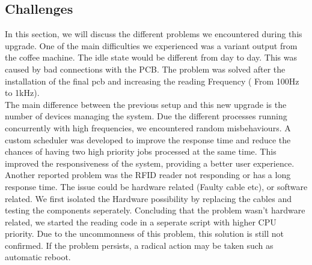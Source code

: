 \documentclass[12pt]{article}
\begin{document}
  \subsection{Challenges}
  
  In this section, we will discuss the different problems we encountered during this upgrade.
  One of the main difficulties we experienced was a variant output from the coffee machine. The idle state would be different from day to day. 
  This was caused by bad connections with the PCB. The problem was solved after the installation of the final pcb and increasing the reading Frequency ( From 100Hz to 1kHz).\\
  
  The main difference between the previous setup and this new upgrade is the number of devices managing the system. 
  Due the different processes running concurrently with high frequencies, we encountered random misbehaviours. 
  A custom scheduler was developed to improve the response time and reduce the chances of having two high priority jobs processed at the same time. 
  This improved the responsiveness of the system, providing a better user experience.\\
  
  Another reported problem was the RFID reader not responding or has a long response time.
  The issue could be hardware related (Faulty cable etc), or software related.
  We first isolated the Hardware possibility by replacing the cables and testing the components seperately. 
  Concluding that the problem wasn't hardware related, we started the reading code in a seperate script with higher CPU priority.
  Due to the uncommonness of this problem, this solution is still not confirmed. If the problem persists, a radical action may be taken such as automatic reboot.\\
  
  
\end{document}
